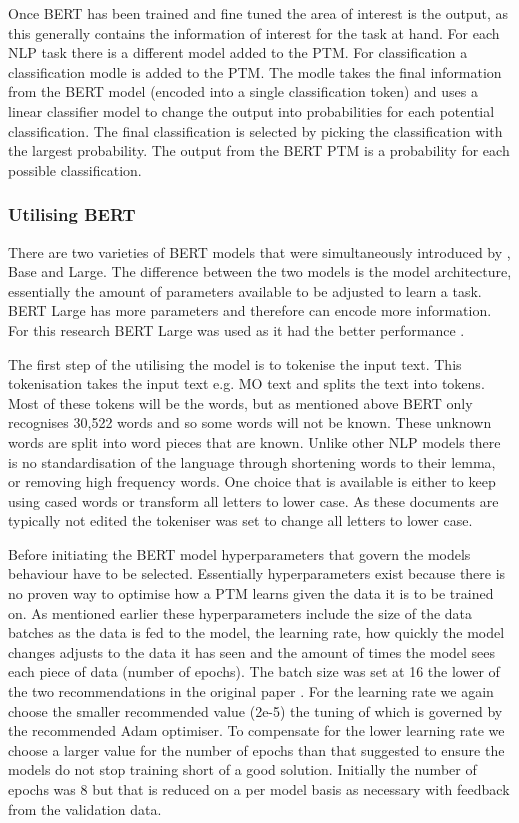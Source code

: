 Once BERT has been trained and fine tuned the area of interest is the output, as this generally contains the information of interest for the task at hand. For each NLP task there is a different model added to the PTM. For classification a classification modle is added to the PTM. The modle takes the final information from the BERT model (encoded into a single classification token) and uses a linear classifier model to change the output into probabilities for each potential classification. The final classification is selected by picking the classification with the largest probability. The output from the BERT PTM is a probability for each possible classification.

\subsubsection{Utilising BERT } There are two varieties of BERT models that were simultaneously introduced by \parencite{devlin2018bert}, Base and Large. The difference between the two models is the model architecture, essentially the amount of parameters available to be adjusted to learn a task. BERT Large has more parameters and therefore can encode more information. For this research BERT Large was used as it had the better performance \parencite{devlin2018bert}.

The first step of the utilising the model is to tokenise the input text. This tokenisation takes the input text e.g. MO text and splits the text into tokens. Most of these tokens will be the words, but as mentioned above BERT only recognises 30,522 words and so some words will not be known. These unknown words are split into word pieces that are known. Unlike other NLP models there is no standardisation of the language through shortening words to their lemma, or removing high frequency words. One choice that is available is either to keep using cased words or transform all letters to lower case. As these documents are typically not edited the tokeniser was set to change all letters to lower case.

Before initiating the BERT model  hyperparameters that govern the models behaviour have to be selected. Essentially hyperparameters exist because there is no proven way to optimise how a PTM learns given the data it is to be trained on. As mentioned earlier these hyperparameters include the size of the data batches as the data is fed to the model, the learning rate, how quickly the model changes adjusts to the data it has seen and the amount of times the model sees each piece of data (number of epochs). The batch size was set at 16 the lower of the two recommendations in the original paper \parencite{devlin2018bert}. For the learning rate we again choose the smaller recommended value (2e-5) the tuning of which is governed by the recommended Adam optimiser. To compensate for the lower learning rate we choose a larger value for the number of epochs than that suggested to ensure the models do not stop training short of a good solution. Initially the number of epochs was 8 but that is reduced on a per model basis as necessary with feedback from the validation data.


